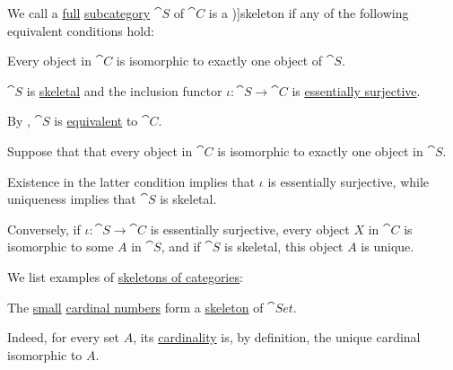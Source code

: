 \begin{definition}\label{def:category_skeleton}
  We call a \hyperref[def:subcategory/full]{full} \hyperref[def:subcategory]{subcategory} \( \cat{S} \) of \( \cat{C} \) is a \term[en=skeleton (\cite[93]{MacLane1998CategoryTheory})]{skeleton} if any of the following equivalent conditions hold:

  \begin{thmenum}
     Every object in \( \cat{C} \) is isomorphic to exactly one object of \( \cat{S} \).

     \( \cat{S} \) is \hyperref[def:skeletal_category]{skeletal} and the inclusion functor \( \iota: \cat{S} \to \cat{C} \) is \hyperref[def:functor_invertibility/essentially_surjective]{essentially surjective}.
  \end{thmenum}
\end{definition}
\begin{comments}
  \item By , \( \cat{S} \) is \hyperref[def:equivalence_of_categories]{equivalent} to \( \cat{C} \).
\end{comments}
\begin{defproof}
   Suppose that that every object in \( \cat{C} \) is isomorphic to exactly one object in \( \cat{S} \).

  Existence in the latter condition implies that \( \iota \) is essentially surjective, while uniqueness implies that \( \cat{S} \) is skeletal.

   Conversely, if \( \iota: \cat{S} \to \cat{C} \) is essentially surjective, every object \( X \) in \( \cat{C} \) is isomorphic to some \( A \) in \( \cat{S} \), and if \( \cat{S} \) is skeletal, this object \( A \) is unique.
\end{defproof}

\begin{example}\label{ex:def:category_skeleton}
  We list examples of \hyperref[def:category_skeleton]{skeletons of categories}:
  \begin{thmenum}
     The \hyperref[def:small_set]{small} \hyperref[def:cardinal]{cardinal numbers} form a \hyperref[def:category_skeleton]{skeleton} of \( \cat{Set} \).

    Indeed, for every set \( A \), its \hyperref[def:cardinality]{cardinality} is, by definition, the unique cardinal isomorphic to \( A \).
  \end{thmenum}
\end{example}

